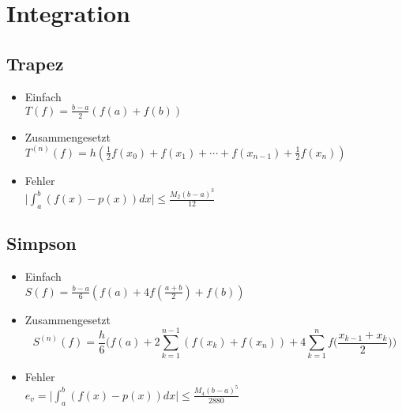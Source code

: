 \section{Integration}

\subsection{Trapez}
\begin{itemize}
	\item Einfach \\
	$T(f) = \frac{b-a}{2} (f(a) + f(b))$
	
	\item Zusammengesetzt \\
	$T^{(n)}(f) = h (\frac{1}{2} f(x_0) + f(x_1) + \cdots + f(x_{n-1}) + \frac{1}{2} f(x_n))$
	
	\item Fehler \\
	$\bigg|\int_a^b (f(x)-p(x)) dx \bigg| \leq \frac{M_2(b-a)^3}{12}$
	
\end{itemize}

\subsection{Simpson}
\begin{itemize}
	\item Einfach \\
	$S(f) = \frac{b-a}{6} (f(a) + 4 f(\frac{a+b}{2}) + f(b))$
	
	\item Zusammengesetzt \\
	\begin{equation*}
		S^{(n)}(f) = \frac{h}{6} \bigg(f(a) + 2 \sum_{k=1}^{n-1}(f(x_k)+f(x_n)) + 4 \sum_{k=1}^nf\big(\frac{x_{k-1}+x_k}{2}\big)\bigg)
	\end{equation*}
	
	\item Fehler \\
	$e_v = \bigg|\int_a^b (f(x)-p(x)) dx \bigg| \leq \frac{M_4(b-a)^5}{2880}$
\end{itemize}

